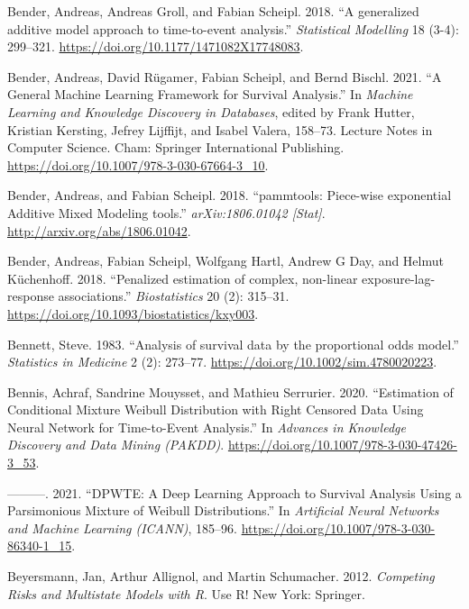 \documentclass[
  letterpaper,
  krantz2]{style/krantz}
\newlength{\cslhangindent}
\newenvironment{CSLReferences}[2] %
 {\begin{list}{}{%
  \setlength{\itemindent}{0pt}
  \setlength{\leftmargin}{0pt}
  \setlength{\parsep}{0pt}
  \ifodd #1
   \setlength{\leftmargin}{\cslhangindent}
   \setlength{\itemindent}{-1\cslhangindent}
  \fi
  \setlength{\itemsep}{#2\baselineskip}}}
 {\end{list}}
\begin{document}
\begin{CSLReferences}{1}{0}
Bender, Andreas, Andreas Groll, and Fabian Scheipl. 2018. {``{A
generalized additive model approach to time-to-event analysis}.''}
\emph{Statistical Modelling} 18 (3-4): 299--321.
\url{https://doi.org/10.1177/1471082X17748083}.

Bender, Andreas, David Rügamer, Fabian Scheipl, and Bernd Bischl. 2021.
{``A {General Machine Learning Framework} for {Survival Analysis}.''} In
\emph{Machine {Learning} and {Knowledge Discovery} in {Databases}},
edited by Frank Hutter, Kristian Kersting, Jefrey Lijffijt, and Isabel
Valera, 158--73. Lecture {Notes} in {Computer Science}. Cham: Springer
International Publishing.
\url{https://doi.org/10.1007/978-3-030-67664-3_10}.

Bender, Andreas, and Fabian Scheipl. 2018. {``{pammtools: Piece-wise
exponential Additive Mixed Modeling tools}.''} \emph{arXiv:1806.01042
{[}Stat{]}}. \url{http://arxiv.org/abs/1806.01042}.

Bender, Andreas, Fabian Scheipl, Wolfgang Hartl, Andrew G Day, and
Helmut Küchenhoff. 2018. {``{Penalized estimation of complex, non-linear
exposure-lag-response associations}.''} \emph{Biostatistics} 20 (2):
315--31. \url{https://doi.org/10.1093/biostatistics/kxy003}.

Bennett, Steve. 1983. {``{Analysis of survival data by the proportional
odds model}.''} \emph{Statistics in Medicine} 2 (2): 273--77.
\url{https://doi.org/10.1002/sim.4780020223}.

Bennis, Achraf, Sandrine Mouysset, and Mathieu Serrurier. 2020.
{``{Estimation of Conditional Mixture Weibull Distribution with Right
Censored Data Using Neural Network for Time-to-Event Analysis}.''} In
\emph{Advances in Knowledge Discovery and Data Mining (PAKDD)}.
\url{https://doi.org/10.1007/978-3-030-47426-3_53}.

---------. 2021. {``{DPWTE: A Deep Learning Approach to Survival
Analysis Using a Parsimonious Mixture of Weibull Distributions}.''} In
\emph{Artificial Neural Networks and Machine Learning (ICANN)}, 185--96.
\url{https://doi.org/10.1007/978-3-030-86340-1_15}.

Beyersmann, Jan, Arthur Allignol, and Martin Schumacher. 2012.
\emph{Competing Risks and Multistate Models with {R}}. Use {R}! New
York: Springer.


\end{CSLReferences}
\end{document}

